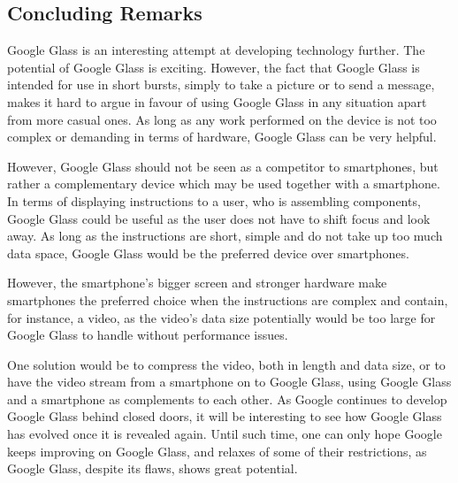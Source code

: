 \subsection{Concluding Remarks}
Google Glass is an interesting attempt at developing technology further. The potential of Google Glass is exciting. However, the fact that Google Glass is intended for use in short bursts, simply to take a picture or to send a message, makes it hard to argue in favour of using Google Glass in any situation apart from more casual ones. As long as any work performed on the device is not too complex or demanding in terms of hardware, Google Glass can be very helpful.

However, Google Glass should not be seen as a competitor to smartphones, but rather a complementary device which may be used together with a smartphone. In terms of displaying instructions to a user, who is assembling components, Google Glass could be useful as the user does not have to shift focus and look away. As long as the instructions are short, simple and do not take up too much data space, Google Glass would be the preferred device over smartphones.

However, the smartphone's bigger screen and stronger hardware make smartphones the preferred choice when the instructions are complex and contain, for instance, a video, as the video's data size potentially would be too large for Google Glass to handle without performance issues.

One solution would be to compress the video, both in length and data size, or to have the video stream from a smartphone on to Google Glass, using Google Glass and a smartphone as complements to each other. As Google continues to develop Google Glass behind closed doors, it will be interesting to see how Google Glass has evolved once it is revealed again. Until such time, one can only hope Google keeps improving on Google Glass, and relaxes of some of their restrictions, as Google Glass, despite its flaws, shows great potential.